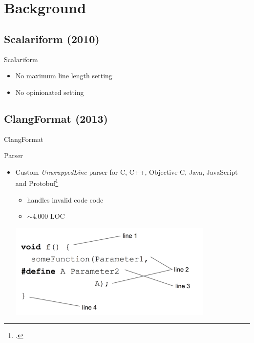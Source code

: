 \documentclass[xcolor=dvipsnames]{beamer}
\theoremstyle{definition}
\begin{document}
\section{Background} %
\label{sec:Background}
\subsection{Scalariform (2010)}

\begin{frame}{Scalariform}
  \begin{itemize}
    \item No maximum line length setting
    \item No opinionated setting
  \end{itemize}
\end{frame}

\subsection{ClangFormat (2013)}

\begin{frame}{}
  \begin{center}
    \Huge ClangFormat
  \end{center}
\end{frame}
\begin{frame}{Parser}
  \begin{itemize}
    \item Custom \emph{UnwrappedLine} parser for C, C++, Objective-C, Java,
      JavaScript and Protobuf\footcite{jasper_clang-format_2014}
      \begin{itemize}
        \item handles invalid code code
        \item $\sim$4.000 LOC
      \end{itemize}
      \begin{center}
        \includegraphics[width=0.8\textwidth]{img/unwrapped.png}
      \end{center}
  \end{itemize}
\end{frame}
\end{document}
